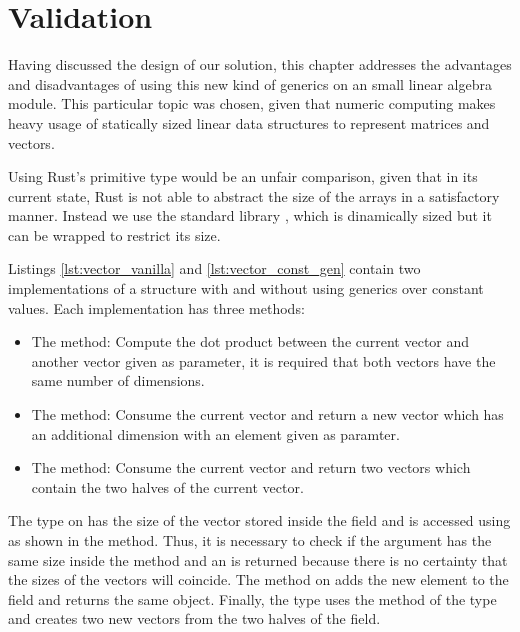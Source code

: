\chapter{Validation}
\label{chap:validation}

Having discussed the design of our solution, this chapter addresses the
advantages and disadvantages of using this new kind of generics on an small
linear algebra module. This particular topic was chosen, given that numeric
computing makes heavy usage of statically sized linear data structures to
represent matrices and vectors.

Using Rust's  primitive type would be an unfair comparison,
given that in its current state, Rust is not able to abstract the size of the
arrays in a satisfactory manner. Instead we use the standard library
, which is dinamically sized but it can be wrapped to restrict its
size.

Listings \ref{lst:vector_vanilla} and \ref{lst:vector_const_gen} contain two
implementations of a  structure with and without using generics
over constant values. Each implementation has three methods:

\begin{itemize}
    \item The  method: Compute the dot product between the current
        vector and another vector given as parameter, it is required that both
        vectors have the same number of dimensions.  
    \item The  method: Consume the current vector and return a
        new vector which has an additional dimension with an element given as
        paramter.  
    \item The  method: Consume the current vector and return two
        vectors which contain the two halves of the current vector.  
\end{itemize}

The  type on  has the size of the vector
stored inside the  field and is accessed using
 as shown in the  method. Thus, it is
necessary to check if the  argument has the same size inside the
 method and an  is returned because there is no
certainty that the sizes of the vectors will coincide. The 
method on  adds the new element to the 
field and returns the same object. Finally, the  type uses the
method  of the  type and creates two new vectors
from the two halves of the  field.

